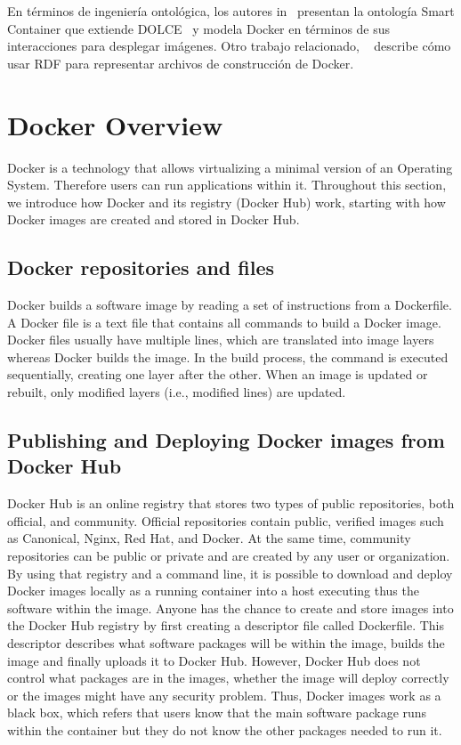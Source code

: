 En términos de ingeniería ontológica, los autores in~\cite{huo2015smart} presentan la ontología Smart Container que extiende DOLCE~\cite{gangemi2002sweetening} y modela Docker en términos de sus interacciones para desplegar imágenes. Otro trabajo relacionado, ~\cite{tommasini2017representing}  describe cómo usar RDF para representar archivos de construcción de Docker. 





\section{Docker Overview}



\label{sec-Docker_overview}
Docker is a technology that allows virtualizing a minimal version of an Operating System. Therefore users can run applications within it. Throughout this section, we introduce how Docker and its registry (Docker Hub) work, starting with how Docker images are created and stored in Docker Hub. 

\subsection{Docker repositories and files}

Docker builds a software image by reading a set of instructions from a Dockerfile. A Docker file is a text file that contains all commands to build a Docker image. Docker files usually have multiple lines, which are translated into image layers whereas Docker builds the image. In the build process, the command is executed sequentially, creating one layer after the other. When an image is updated or rebuilt, only modified layers (i.e., modified lines) are updated. 


\subsection{Publishing and Deploying Docker images from Docker Hub}

Docker Hub is an online registry that stores two types of public repositories, both official, and community. Official repositories contain public, verified images such as Canonical, Nginx, Red Hat, and Docker. At the same time, community repositories can be public or private and are created by any user or organization.
By using that registry and a command line, it is possible to download and deploy Docker images locally as a running container into a host executing thus the software within the image. 
Anyone has the chance to create and store images into the Docker Hub registry by first creating a descriptor file called Dockerfile. 
This descriptor describes what software packages will be within the image, builds the image and finally uploads it to Docker Hub. However, Docker Hub does not control what packages are in the images, whether the image will deploy correctly or the images might have any security problem. 
Thus, Docker images work as a black box, which refers that users know that the main software package runs within the container but they do not know the other packages needed to run it.



